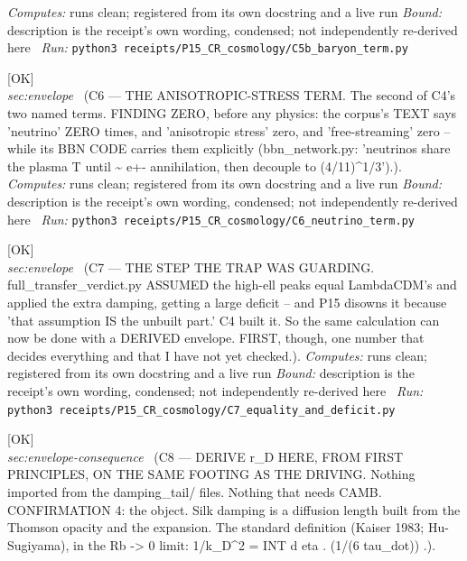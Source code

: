 \begin{description}
\emph{Computes:} runs clean; registered from its own docstring and a live run
 \emph{Bound:} description is the receipt's own wording, condensed; not independently re-derived here
\ \emph{Run:} \texttt{python3 receipts/P15\_CR\_cosmology/C5b\_baryon\_term.py}
\item[\rcptlabel{C6_neutrino_term}{P15R52}\textbf{P15R52}\quad\texttt{C6\_neutrino\_term}]\hfill\textsf{[OK]}\\
\textit{sec:envelope} \ (C6 --- THE ANISOTROPIC-STRESS TERM. The second of C4's two named terms. FINDING ZERO, before any physics: the corpus's TEXT says 'neutrino' ZERO times, and 'anisotropic stress' zero, and 'free-streaming' zero -- while its BBN CODE carries them explicitly (bbn\_network.py: 'neutrinos share the plasma T until \textasciitilde{} e+- annihilation, then decouple to (4/11)\textasciicircum{}1/3').). 
\emph{Computes:} runs clean; registered from its own docstring and a live run
 \emph{Bound:} description is the receipt's own wording, condensed; not independently re-derived here
\ \emph{Run:} \texttt{python3 receipts/P15\_CR\_cosmology/C6\_neutrino\_term.py}
\item[\rcptlabel{C7_equality_and_deficit}{P15R53}\textbf{P15R53}\quad\texttt{C7\_equality\_and\_deficit}]\hfill\textsf{[OK]}\\
\textit{sec:envelope} \ (C7 --- THE STEP THE TRAP WAS GUARDING. full\_transfer\_verdict.py ASSUMED the high-ell peaks equal LambdaCDM's and applied the extra damping, getting a large deficit -- and P15 disowns it because 'that assumption IS the unbuilt part.' C4 built it. So the same calculation can now be done with a DERIVED envelope. FIRST, though, one number that decides everything and that I have not yet checked.). 
\emph{Computes:} runs clean; registered from its own docstring and a live run
 \emph{Bound:} description is the receipt's own wording, condensed; not independently re-derived here
\ \emph{Run:} \texttt{python3 receipts/P15\_CR\_cosmology/C7\_equality\_and\_deficit.py}
\item[\rcptlabel{C8_diffusion_length}{P15R54}\textbf{P15R54}\quad\texttt{C8\_diffusion\_length}]\hfill\textsf{[OK]}\\
\textit{sec:envelope-consequence} \ (C8 --- DERIVE r\_D HERE, FROM FIRST PRINCIPLES, ON THE SAME FOOTING AS THE DRIVING. Nothing imported from the damping\_tail/ files. Nothing that needs CAMB. CONFIRMATION 4: the object. Silk damping is a diffusion length built from the Thomson opacity and the expansion. The standard definition (Kaiser 1983; Hu-Sugiyama), in the Rb -> 0 limit: 1/k\_D\textasciicircum{}2 = INT d eta . (1/(6 tau\_dot)) .). 

\end{description}
